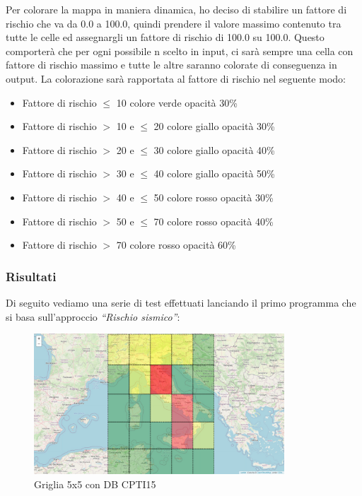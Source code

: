 Per colorare la mappa in maniera dinamica, ho deciso di stabilire un fattore di rischio che va da 0.0 a 100.0, quindi prendere il valore massimo contenuto tra tutte le celle ed assegnargli un fattore di rischio di 100.0 su 100.0. Questo comporter\`a che per ogni possibile n scelto in input, ci sar\`a sempre una cella con fattore di rischio massimo e tutte le altre saranno colorate di conseguenza in output. La colorazione sar\`a rapportata al fattore di rischio nel seguente modo:
\begin{itemize}
\item Fattore di rischio $\le$ 10 colore verde opacit\`a 30\%
\item Fattore di rischio $>$ 10 e $\le$ 20 colore giallo opacit\`a 30\%
\item Fattore di rischio $>$ 20 e $\le$ 30 colore giallo opacit\`a 40\%
\item Fattore di rischio $>$ 30 e $\le$ 40 colore giallo opacit\`a 50\%
\item Fattore di rischio $>$ 40 e $\le$ 50 colore rosso opacit\`a 30\%
\item Fattore di rischio $>$ 50 e $\le$ 70 colore rosso opacit\`a 40\%
\item Fattore di rischio $>$ 70 colore rosso opacit\`a 60\%
\end{itemize}

\subsubsection{Risultati}

Di seguito vediamo una serie di test effettuati lanciando il primo programma che si basa sull'approccio \textit{``Rischio sismico''}:

\begin{figure}[H]
   \centering
   \includegraphics[width=0.835\textwidth]{images/5x5_CPTI15.jpg}
   \caption{Griglia 5x5 con DB CPTI15}
\end{figure}


